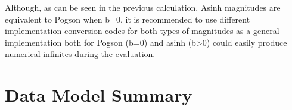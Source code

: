 \documentclass[11pt,a4paper]{ivoa}
\begin{document}
\begin{appendices}
Although, as can be seen in the previous calculation, Asinh magnitudes are equivalent to Pogson
when b=0, it is recommended to use different implementation conversion codes for both types of magnitudes as a general implementation both for Pogson (b=0) and asinh (b>0) could easily produce numerical infinites during the evaluation.
\par


\section{Data Model Summary}




\end{appendices}
\end{document}
